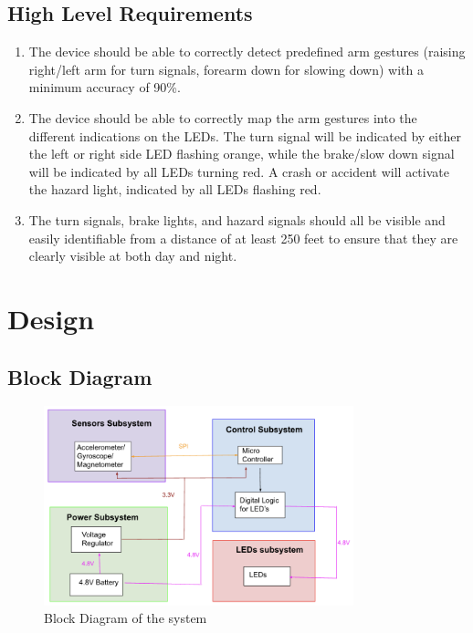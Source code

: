 \documentclass[12pt]{article}
\begin{document}
\subsection{High Level Requirements}
\begin{enumerate}
    \item The device should be able to correctly detect 
    predefined arm gestures (raising right/left arm for 
    turn signals, forearm down for slowing down) with a 
    minimum accuracy of 90\%. 

    \item The device should be able to correctly map the arm gestures into the different indications on the LEDs. The turn signal will be indicated by either the left or right side LED flashing orange, while the brake/slow down signal will be indicated by all LEDs turning red. A crash or accident will activate the hazard light, indicated by all LEDs flashing red. 

    \item The turn signals, brake lights, and hazard signals should all be visible and easily identifiable from a distance of at least 250 feet to ensure that they are clearly visible at both day and night. 
\end{enumerate}

\newpage
\section{Design}
\subsection{Block Diagram}
\begin{figure}[ht]
    \centering
    \includegraphics[width=0.8\textwidth]{block_diagram.png}
    \caption{Block Diagram of the system}
    \label{fig:my_label1}
\end{figure}
\end{document}
